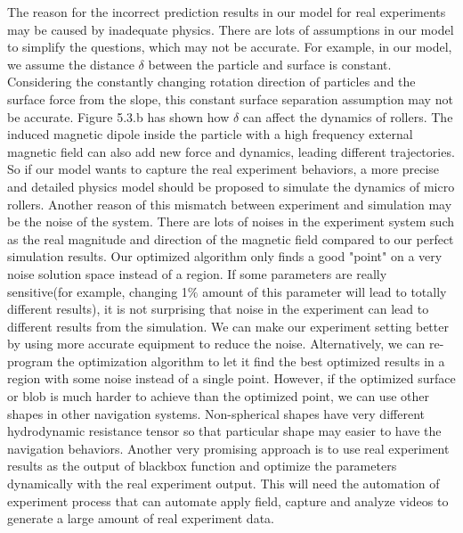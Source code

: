  The reason for the incorrect prediction results in our model for real experiments may be caused by inadequate physics. There are lots of assumptions in our model to simplify the questions, which may not be accurate. For example, in our model,  we assume the distance $\delta$ between the particle and surface is constant. Considering the constantly changing rotation direction of particles and the surface force from the slope, this constant surface separation assumption may not be accurate. Figure 5.3.b has shown how $\delta$ can affect the dynamics of rollers. The induced magnetic dipole inside the particle with a high frequency external magnetic field can also add new force and dynamics, leading different trajectories.
 So if our model wants to capture the real experiment behaviors, a more precise and detailed physics model should be proposed to  simulate the dynamics of micro rollers. Another reason of this mismatch between experiment and simulation may be the noise of the system. There are lots of noises in the experiment system  such as the real magnitude and direction of the magnetic field compared to our perfect simulation results. Our optimized algorithm only finds a good  "point" on a very noise solution space instead of a region. If some parameters are really sensitive(for example, changing 1$\%$ amount of this parameter will lead to totally different results), it is not surprising that noise in the experiment can lead to different results from the simulation. We can make our experiment setting better by using more accurate equipment to reduce the noise. Alternatively, we can re-program the optimization algorithm to let it find the best optimized results in a region with some noise instead of a single point. However, if the optimized  surface or blob is much harder to achieve than the optimized point, we can use other shapes in other navigation systems. Non-spherical shapes have very different hydrodynamic resistance tensor\cite{brooks2018shape} so that particular shape may easier to have the navigation behaviors. Another very promising approach is to use real experiment results as the output of blackbox function and optimize the parameters dynamically with the real experiment output. This will need the automation of experiment process that can automate apply field, capture and analyze  videos to generate a large amount of real experiment data.\cite{oulmas20183d}

